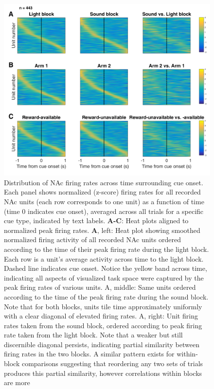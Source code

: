 \documentclass[11pt]{article}
\newcommand{\bsf}[1]{\textbf{#1}}
\begin{document}
 \begin{figure}[ht!]
\centering
\includegraphics[width=\textwidth]{Fig 6 - Task tiling.pdf}
\caption{Distribution of NAc firing rates across time surrounding cue
onset. Each panel shows normalized (z-score) firing rates for all recorded NAc
units (each row corresponds to one unit) as a function of time (time 0
indicates cue onset), averaged across all trials for a specific cue type,
indicated by text labels. \bsf{A-C}: Heat plots aligned to normalized peak
firing rates. \bsf{A}, left: Heat plot showing smoothed normalized firing
activity of all recorded NAc units ordered according to the time of their peak
firing rate during the light block. Each row is a unit’s average activity
across time to the light block. Dashed line indicates cue onset. Notice the
yellow band across time, indicating all aspects of visualized task space were
captured by the peak firing rates of various units. A, middle: Same units
ordered according to the time of the peak firing rate during the sound
block. Note that for both blocks, units tile time approximately uniformly with
a clear diagonal of elevated firing rates. A, right: Unit firing rates
taken from the sound block, ordered according to peak firing rate taken from
the light block. Note that a weaker but still discernible diagonal persists,
indicating partial similarity between firing rates in the two blocks. A similar pattern exists for within-block comparisons suggesting that reordering any two sets of trials
produces this partial similarity, however correlations within blocks are more
}
\end{figure}
\end{document}
